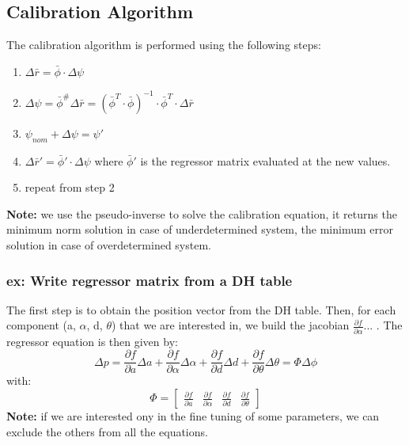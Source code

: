 \documentclass[a4paper,12pt]{article}
\begin{document}
\subsection{Calibration Algorithm}
The calibration algorithm is performed using the following steps:
\begin{enumerate}
    \item $\Delta \bar{r}= \bar{\phi} \cdot \Delta \psi$
    \item $\Delta \psi = \bar{\phi}^\# \Delta\bar{r}= (\bar{\phi}^T \cdot \bar{\phi})^{-1} \cdot \bar{\phi}^T \cdot \Delta \bar{r}$
    \item $ \psi_{nom} + \Delta \psi = \psi ' $
    \item $ \Delta \bar{r}' = \bar{\phi}' \cdot \Delta \psi$ where $\bar{\phi}'$ is the regressor
     matrix evaluated at the new values.
    \item repeat from step 2
\end{enumerate}
\textbf{Note:} we use the pseudo-inverse to solve the calibration equation,
it returns the minimum norm solution in case of underdetermined system,
the minimum error solution in case of overdetermined system.
\subsubsection{ex: Write regressor matrix from a DH table}
The first step is to obtain the position vector from the DH table.
Then, for each component (a, $\alpha$, d, $\theta$) that we are interested in, we
build the jacobian $ \frac{\partial f}{\partial \alpha} $... .
The regressor equation is then given by:
\begin{equation}
    \Delta p = \frac{\partial f}{\partial a} \Delta a + \frac{\partial f}{\partial \alpha} \Delta \alpha + \frac{\partial f}{\partial d}\Delta d + \frac{\partial f}{\partial \theta} \Delta \theta= \Phi \Delta \phi
\end{equation}
with:
\begin{equation}
    \Phi = \begin{bmatrix}
        \frac{\partial f}{\partial a} & \frac{\partial f}{\partial \alpha} & \frac{\partial f}{\partial d}& \frac{\partial f}{\partial \theta}
    \end{bmatrix}
\end{equation}
\textbf{Note:} if we are interested ony in the fine tuning of some parameters, we can
exclude the others from all the equations.
\end{document}
